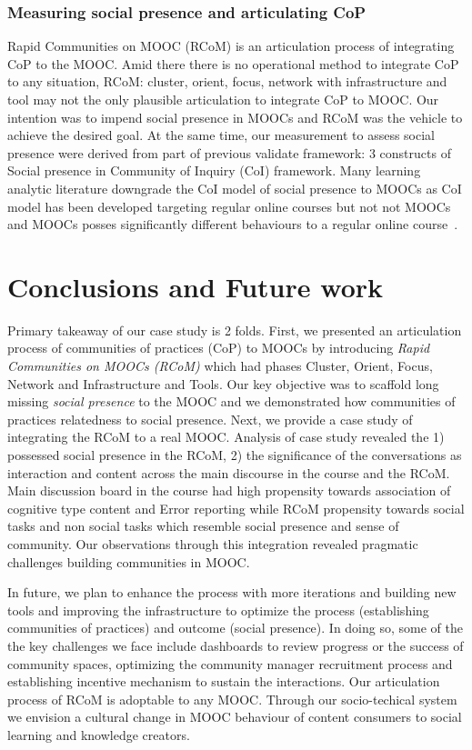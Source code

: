 \documentclass[format=acmsmall, review=false, screen=true]{acmart}
\begin{document}
\subsubsection{Measuring social presence and articulating CoP}
Rapid Communities on MOOC (RCoM) is an articulation process of integrating CoP to the MOOC. Amid there there is no operational method to integrate CoP to any situation, RCoM: cluster, orient, focus, network with infrastructure and tool may not the only plausible articulation to integrate CoP to MOOC. Our intention was to impend social presence in MOOCs and RCoM was the vehicle to achieve the desired goal. At the same time, our measurement to assess social presence were derived from part of previous validate framework: 3 constructs of Social presence in Community of Inquiry (CoI) framework. Many learning analytic literature downgrade the CoI model of social presence to MOOCs as CoI model has been developed targeting regular online courses but not not MOOCs and MOOCs posses significantly different behaviours to a regular online course~\cite{poquet2018mooc}.

\section{Conclusions and Future work}
Primary takeaway of our case study is 2 folds. First, we presented an articulation process of communities of practices (CoP) to MOOCs by introducing \textit{Rapid Communities on MOOCs (RCoM)} which had phases Cluster, Orient, Focus, Network and Infrastructure and Tools. Our key objective was to scaffold long missing \textit{social presence} to the MOOC and we demonstrated how communities of practices relatedness to social presence. Next, we provide a case study of integrating the RCoM to a real MOOC. Analysis of case study revealed the 1) possessed social presence in the RCoM, 2) the significance of the conversations as interaction and content across the main discourse in the course and the RCoM. Main discussion board in the course had high propensity towards association of cognitive type content and Error reporting while RCoM propensity towards social tasks and non social tasks which resemble social presence and sense of community. Our observations through this integration revealed pragmatic challenges building communities in MOOC. 

In future, we plan to enhance the process with more iterations and building new tools and improving the infrastructure to optimize the process (establishing communities of practices) and outcome (social presence). In doing so, some of the the key challenges we face include dashboards to review progress or the success of community spaces, optimizing the community manager recruitment process and establishing incentive mechanism to sustain the interactions. Our articulation process of RCoM is adoptable to any MOOC. Through our socio-techical system we envision a cultural change in MOOC behaviour of content consumers to social learning and knowledge creators. 
\end{document}
